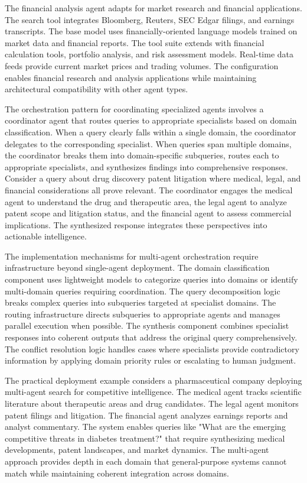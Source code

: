 The financial analysis agent adapts for market research and financial applications. The search tool integrates Bloomberg, Reuters, SEC Edgar filings, and earnings transcripts. The base model uses financially-oriented language models trained on market data and financial reports. The tool suite extends with financial calculation tools, portfolio analysis, and risk assessment models. Real-time data feeds provide current market prices and trading volumes. The configuration enables financial research and analysis applications while maintaining architectural compatibility with other agent types.

The orchestration pattern for coordinating specialized agents involves a coordinator agent that routes queries to appropriate specialists based on domain classification. When a query clearly falls within a single domain, the coordinator delegates to the corresponding specialist. When queries span multiple domains, the coordinator breaks them into domain-specific subqueries, routes each to appropriate specialists, and synthesizes findings into comprehensive responses. Consider a query about drug discovery patent litigation where medical, legal, and financial considerations all prove relevant. The coordinator engages the medical agent to understand the drug and therapeutic area, the legal agent to analyze patent scope and litigation status, and the financial agent to assess commercial implications. The synthesized response integrates these perspectives into actionable intelligence.

The implementation mechanisms for multi-agent orchestration require infrastructure beyond single-agent deployment. The domain classification component uses lightweight models to categorize queries into domains or identify multi-domain queries requiring coordination. The query decomposition logic breaks complex queries into subqueries targeted at specialist domains. The routing infrastructure directs subqueries to appropriate agents and manages parallel execution when possible. The synthesis component combines specialist responses into coherent outputs that address the original query comprehensively. The conflict resolution logic handles cases where specialists provide contradictory information by applying domain priority rules or escalating to human judgment.

The practical deployment example considers a pharmaceutical company deploying multi-agent search for competitive intelligence. The medical agent tracks scientific literature about therapeutic areas and drug candidates. The legal agent monitors patent filings and litigation. The financial agent analyzes earnings reports and analyst commentary. The system enables queries like "What are the emerging competitive threats in diabetes treatment?" that require synthesizing medical developments, patent landscapes, and market dynamics. The multi-agent approach provides depth in each domain that general-purpose systems cannot match while maintaining coherent integration across domains.


